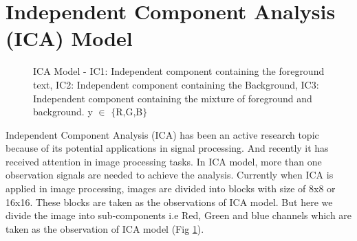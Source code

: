 

\section{Independent Component Analysis (ICA) Model}
\label{sec:format}
 

\begin{figure}[t]
\centering
{}
\caption
{ICA Model - IC1: Independent component containing the foreground text, IC2: Independent
component containing the Background, IC3: Independent component containing the mixture of foreground and background.
y $\in$ $\{$R,G,B$\}$}
\label{fig:frame}
\end{figure}
Independent Component Analysis (ICA) has been an active research topic 
because of its potential applications in signal processing. And recently 
it has received attention in image processing tasks.
In ICA model, more than one observation signals are needed to achieve the 
analysis.
Currently when ICA is applied in image processing, images are divided into blocks \cite{chap4-1,chap4-2,chap4-3}  
with size of 8x8 or 16x16. These blocks are taken as the observations of ICA model.
But here we divide the image into sub-components i.e Red, Green and blue channels which are
taken as the observation of ICA model (Fig \ref{fig:frame}). 

